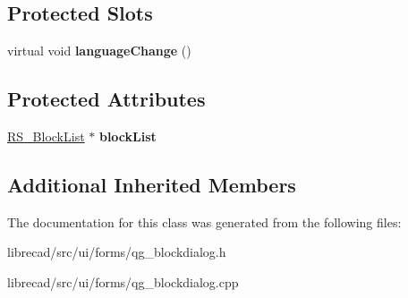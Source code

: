 \subsection*{Protected Slots}
\begin{DoxyCompactItemize}
\item 
\hypertarget{classQG__BlockDialog_a30be986fd323a3b23e079463cee04485}{virtual void {\bfseries language\-Change} ()}\label{classQG__BlockDialog_a30be986fd323a3b23e079463cee04485}

\end{DoxyCompactItemize}
\subsection*{Protected Attributes}
\begin{DoxyCompactItemize}
\item 
\hypertarget{classQG__BlockDialog_a49b730de22faa4f89f21260b641d6290}{\hyperlink{classRS__BlockList}{R\-S\-\_\-\-Block\-List} $\ast$ {\bfseries block\-List}}\label{classQG__BlockDialog_a49b730de22faa4f89f21260b641d6290}

\end{DoxyCompactItemize}
\subsection*{Additional Inherited Members}


The documentation for this class was generated from the following files\-:\begin{DoxyCompactItemize}
\item 
librecad/src/ui/forms/qg\-\_\-blockdialog.\-h\item 
librecad/src/ui/forms/qg\-\_\-blockdialog.\-cpp\end{DoxyCompactItemize}

